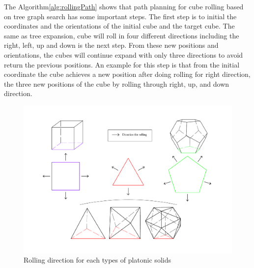 The Algorithm\ref{alg:rollingPath} shows that path planning for cube rolling based on tree graph search has some important steps. The first step is to initial the coordinates and the orientations of the initial cube and the target cube. The same as tree expansion, cube will roll in four different directions including the right, left, up and down is the next step. From these new positions and orientations, the cubes will continue expand with only three directions to avoid return the previous positions. An example for this step is that from the initial coordinate the cube achieves a new position after doing rolling for right direction, the three new positions of the cube by rolling through right, up, and down direction. 
% 
%
%
\begin{figure}[h]
\centering
	\includegraphics[width=1\textwidth]{image/rollingDir2.pdf}
	\caption{Rolling direction for each types of platonic solids}
	\label{fig:rollingDir}
\end{figure}
%
% 
%
%
%
%
\clearpage
\newpage
